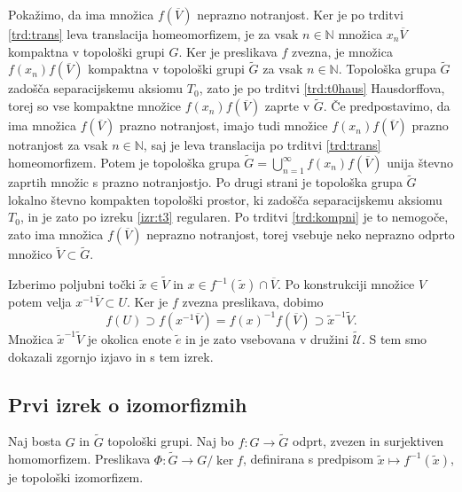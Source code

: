 \documentclass[mat1]{fmfdelo}
\newcommand{\N}{\mathbb N}
\newcommand{\Ucurl}{\mathcal{U}}
\newcommand{\closure}[1]{\overline{#1}}
\begin{document}
\begin{dokaz}
Pokažimo, da ima množica $f(\closure{V})$ neprazno notranjost. Ker je po trditvi \ref{trd:trans} leva translacija homeomorfizem, je za vsak $n \in \N$ množica $x_n\closure{V}$ kompaktna v topološki grupi $G$. Ker je preslikava $f$ zvezna, je množica $f(x_n)f(\closure{V})$ kompaktna v topološki grupi $\widetilde{G}$ za vsak $n \in \N$. Topološka grupa $\widetilde{G}$ zadošča separacijskemu aksiomu $T_0$, zato je po trditvi \ref{trd:t0haus} Hausdorffova, torej so vse kompaktne množice $f(x_n)f(\closure{V})$ zaprte v $\widetilde{G}$. Če predpostavimo, da ima množica $f(\closure{V})$ prazno notranjost, imajo tudi množice $f(x_n)f(\closure{V})$ prazno notranjost za vsak $n \in \N$, saj je leva translacija po trditvi \ref{trd:trans} homeomorfizem. Potem je topološka grupa $\widetilde{G} = \bigcup_{n=1}^\infty f(x_n)f(\closure{V})$ unija števno zaprtih množic s prazno notranjostjo. Po drugi strani je topološka grupa $\widetilde{G}$ lokalno števno kompakten topološki prostor, ki zadošča separacijskemu aksiomu $T_0$, in je zato po izreku \ref{izr:t3} regularen. Po trditvi \ref{trd:kompni} je to nemogoče, zato ima množica $f(\closure{V})$ neprazno notranjost, torej vsebuje neko neprazno odprto množico $\widetilde{V} \subset \widetilde{G}$.

Izberimo poljubni točki $\tilde{x} \in \widetilde{V}$ in $x \in f^{-1}(\tilde{x})\cap\closure{V}$.
Po konstrukciji množice $V$ potem velja $x^{-1}\closure{V} \subset U$. Ker je $f$ zvezna preslikava, dobimo
\[ f(U) \supset f(x^{-1}\closure{V}) = f(x)^{-1}f(\closure{V}) \supset \tilde{x}^{-1}\widetilde{V}. \]
Množica $\tilde{x}^{-1}\widetilde{V}$ je okolica enote $\tilde{e}$ in je zato vsebovana v družini $\widetilde{\Ucurl}$. S tem smo dokazali zgornjo izjavo in s tem izrek.
\end{dokaz}

\subsection{Prvi izrek o izomorfizmih}
\begin{izrek}\label{izr:prvitopizrek}
Naj bosta $G$ in $\widetilde{G}$ topološki grupi. Naj bo $f\colon G \to \widetilde{G}$ odprt, zvezen in surjektiven homomorfizem. Preslikava $\Phi\colon\widetilde{G} \to G/\ker f$, definirana s predpisom $\tilde{x} \mapsto f^{-1}(\tilde{x})$, je topološki izomorfizem.
\end{izrek}
\end{document}
